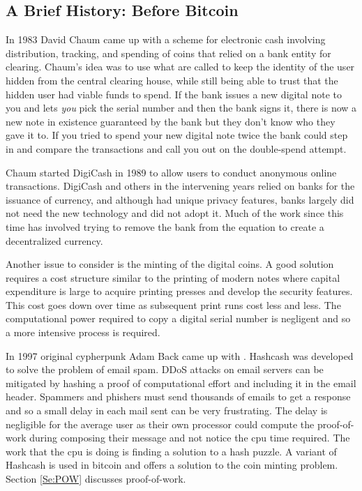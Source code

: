 \subsection*{A Brief History: Before Bitcoin}
In 1983 David Chaum came up with a scheme for electronic cash involving distribution, tracking, and spending of coins that relied on a bank entity for clearing. Chaum's idea was to use what are called  to keep the identity of the user hidden from the central clearing house, while still being able to trust that the hidden user had viable funds to spend. If the bank issues a new digital note to you and lets \textit{you} pick the serial number and then the bank signs it, there is now a new note in existence guaranteed by the bank but they don't know who they gave it to. If you tried to spend your new digital note twice the bank could step in and compare the transactions and call you out on the double-spend attempt.

Chaum started DigiCash in 1989 to allow users to conduct anonymous online transactions. DigiCash and others in the intervening years relied on banks for the issuance of currency, and although had unique privacy features, banks largely did not need the new technology and did not adopt it. Much of the work since this time has involved trying to remove the bank from the equation to create a decentralized currency.  

Another issue to consider is the minting of the digital coins. A good solution requires a cost structure similar to the printing of modern notes where capital expenditure is large to acquire printing presses and develop the security features. This cost goes down over time as subsequent print runs cost less and less. The computational power required to copy a digital serial number is negligent and so a more intensive process is required.

In 1997 original cypherpunk Adam Back came up with . Hashcash was developed to solve the problem of email spam. DDoS attacks on email servers can be mitigated by hashing a proof of computational effort and including it in the email header. Spammers and phishers must send thousands of emails to get a response and so a small delay in each mail sent can be very frustrating. The delay is negligible for the average user as their own processor could compute the proof-of-work during composing their message and not notice the cpu time required. The work that the cpu is doing is finding a solution to a hash puzzle. A variant of Hashcash is used in bitcoin and offers a solution to the coin minting problem. Section \ref{Se:POW} discusses proof-of-work.

